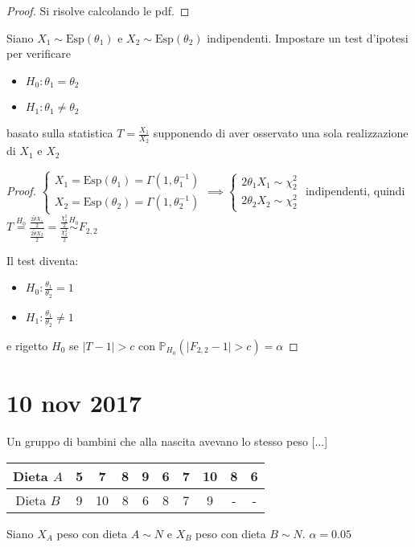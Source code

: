 \documentclass[hidelinks, 10pt]{report}
\begin{document}
\begin{proof}
Si risolve calcolando le pdf.
\end{proof}

\begin{ex}
Siano $ X_{1} \sim \text{Esp} (\theta_{1}) $ e $ X_{2} \sim \text{Esp} (\theta_{2}) $ indipendenti. Impostare un test d'ipotesi per verificare
\begin{itemize}
\item $ H_{0}: \theta_{1} = \theta_{2} $
\item $ H_{1}: \theta_{1} \ne \theta_{2} $
\end{itemize}
basato sulla statistica $ T = \frac{X_{1}}{X_{2}} $ supponendo di aver osservato una sola realizzazione di $ X_{1} $ e $ X_{2} $
\end{ex}

\begin{proof}
$ \begin{cases}
X_{1} = \text{Esp} (\theta_{1}) = \Gamma(1, \theta_{1}^{-1}) \\
X_{2} = \text{Esp} (\theta_{2}) = \Gamma (1, \theta_{2}^{-1})
\end{cases} \implies \begin{cases}
2 \theta_{1} X_{1} \sim \chi^{2}_{2} \\
2 \theta_{2} X_{2} \sim \chi^{2}_{2}
\end{cases} $ indipendenti, quindi $ T \stackrel{H_{0}}{=} \frac{\frac{2 \tilde{\theta} X_{1}}{2}}{\frac{2 \tilde{\theta} X_{2}}{2}} = \frac{\frac{\chi^{2}_{2}}{2}}{\frac{\chi^{2}_{2}}{2}} \stackrel{H_{0}}{\sim} F_{2, 2} $

Il test diventa:
\begin{itemize}
\item $ H_{0}: \frac{\theta_{1}}{\theta_{2}} = 1 $
\item $ H_{1}: \frac{\theta_{1}}{\theta_{2}} \ne 1 $
\end{itemize}

e rigetto $ H_{0} $ se $ \vert T - 1 \vert > c $ con $ \mathbb{P}_{H_{0}} (\vert F_{2, 2} - 1 \vert > c) = \alpha $
\end{proof}

\section{10 nov 2017}
\begin{ex}
Un gruppo di bambini che alla nascita avevano lo stesso peso [...]

\begin{center}
\begin{tabular}{c|c|c|c|c|c|c|c|c|c}
\hline
	Dieta $ A $ & 5 & 7 & 8 & 9 & 6 & 7 & 10 & 8 & 6 \\
\hline
	Dieta $ B $ & 9 & 10 & 8 & 6 & 8 & 7 & 9 & - & - \\
\hline
\end{tabular}
\end{center}

Siano $ X_{A} $ peso con dieta $ A \sim N $ e $ X_{B} $ peso con dieta $ B \sim N $. $ \alpha = 0.05 $
\end{ex}
\end{document}
